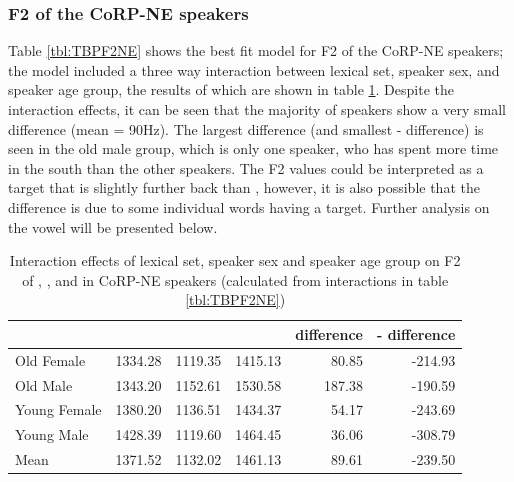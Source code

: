 \documentclass[../../../00.FullDoc/tex/ThesisSkeleton-draft2]{subfiles}
\begin{document}
\subsubsection{F2 of the CoRP-NE speakers}
Table \ref{tbl:TBPF2NE}  shows the best fit model for F2 of the CoRP-NE speakers; the model included a three way interaction between lexical set, speaker sex, and speaker age group, the results of which are shown in table \ref{tbl:TBPF2NEinter}. Despite the interaction effects, it can be seen that the majority of speakers show a very small \TB{} difference (mean = 90Hz). The largest \TB{} difference (and smallest \palm{}-\bath{} difference) is seen in the old male group, which is only one speaker, who has spent more time in the south than the other speakers.
The F2 values could be interpreted as a \bath{} target that is slightly further back than \trap{}, however, it is also possible that the difference is due to some individual \bath{} words having a \palm{} target. Further analysis on the \bath{} vowel will be presented below.

\begin{table}[htbp]
	\centering
	\begin{tabular}{lrrrrr}
		\hline
		& \multicolumn{1}{l}{\bath{}} & \multicolumn{1}{l}{\palm{}} & \multicolumn{1}{l}{\trap{}} & \multicolumn{1}{l}{\TB{} difference} & \multicolumn{1}{l}{\palm{}-\bath{} difference} \\
		\hline
		Old Female & 1334.28 & 1119.35 & 1415.13 & 80.85 & -214.93 \\
		Old Male & 1343.20 & 1152.61 & 1530.58 & 187.38 & -190.59 \\
		Young Female & 1380.20 & 1136.51 & 1434.37 & 54.17 & -243.69 \\
		Young Male & 1428.39 & 1119.60 & 1464.45 & 36.06 & -308.79 \\
		Mean  & 1371.52 & 1132.02 & 1461.13 & 89.61 & -239.50 \\
		\hline
	\end{tabular}%
	\caption{Interaction effects of lexical set, speaker sex and speaker age group on F2 of \trap{}, \bath{}, and \palm{} in CoRP-NE speakers (calculated from interactions in table \ref{tbl:TBPF2NE})}
	\label{tbl:TBPF2NEinter}%
\end{table}%
\end{document}
